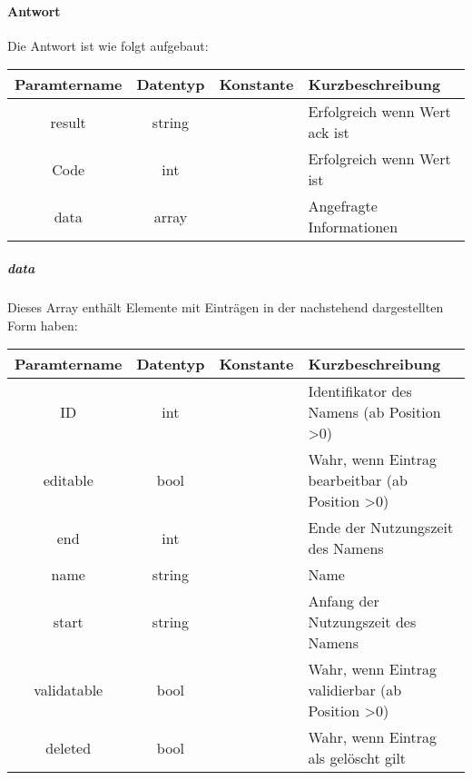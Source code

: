 \paragraph{Antwort}Die Antwort ist wie folgt aufgebaut:
\begin{table}[H]
	\begin{tabular}{|c|c|c|p{6.5cm}|}
		\hline
		\textbf{Paramtername} & \textbf{Datentyp} & \textbf{Konstante} & \textbf{Kurzbeschreibung}                                                                                               \\ \hline
		result              & string           &                 & Erfolgreich wenn Wert {\glqq ack\grqq} ist \\ \hline
		Code                & int              &                 & Erfolgreich wenn Wert {\glqq 0\grqq} ist \\ \hline
		data                & array            &                 & Angefragte Informationen \\ \hline
	\end{tabular}
\end{table}
\subparagraph{data}Dieses Array enthält Elemente mit Einträgen in der nachstehend dargestellten Form haben:
\begin{table}[H]
	\begin{tabular}{|c|c|c|p{6.5cm}|}
		\hline
		\textbf{Paramtername} & \textbf{Datentyp} & \textbf{Konstante} & \textbf{Kurzbeschreibung}    \\ \hline
		ID                     & int             &                 & Identifikator des Namens (ab Position >0) \\ \hline
		editable               & bool            &                 & Wahr, wenn Eintrag bearbeitbar (ab Position >0) \\ \hline
		end                    & int             &                 & Ende der Nutzungszeit des Namens \\ \hline
		name                   & string          &                 & Name \\ \hline
		start                  & string          &                 & Anfang der Nutzungszeit des Namens \\ \hline
		validatable            & bool            &                 & Wahr, wenn Eintrag validierbar (ab Position >0) \\ \hline
		deleted                & bool            &                 & Wahr, wenn Eintrag als gelöscht gilt \\ \hline
	\end{tabular}
\end{table}

